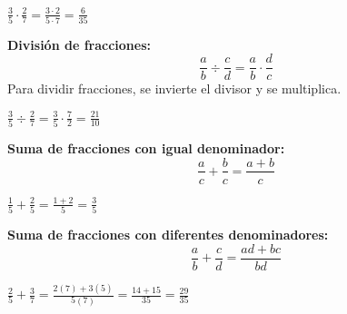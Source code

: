 \begin{example}
$\frac{3}{5} \cdot \frac{2}{7} = \frac{3 \cdot 2}{5 \cdot 7} = \frac{6}{35}$
\end{example}

\begin{theorem}
\textbf{División de fracciones:}
$$\frac{a}{b} \div \frac{c}{d} = \frac{a}{b} \cdot \frac{d}{c}$$
Para dividir fracciones, se invierte el divisor y se multiplica.
\end{theorem}

\begin{example}
$\frac{3}{5} \div \frac{2}{7} = \frac{3}{5} \cdot \frac{7}{2} = \frac{21}{10}$
\end{example}

\begin{theorem}
\textbf{Suma de fracciones con igual denominador:}
$$\frac{a}{c} + \frac{b}{c} = \frac{a + b}{c}$$
\end{theorem}

\begin{example}
$\frac{1}{5} + \frac{2}{5} = \frac{1 + 2}{5} = \frac{3}{5}$
\end{example}

\begin{theorem}
\textbf{Suma de fracciones con diferentes denominadores:}
$$\frac{a}{b} + \frac{c}{d} = \frac{ad + bc}{bd}$$
\end{theorem}

\begin{example}
$\frac{2}{5} + \frac{3}{7} = \frac{2(7) + 3(5)}{5(7)} = \frac{14 + 15}{35} = \frac{29}{35}$
\end{example}